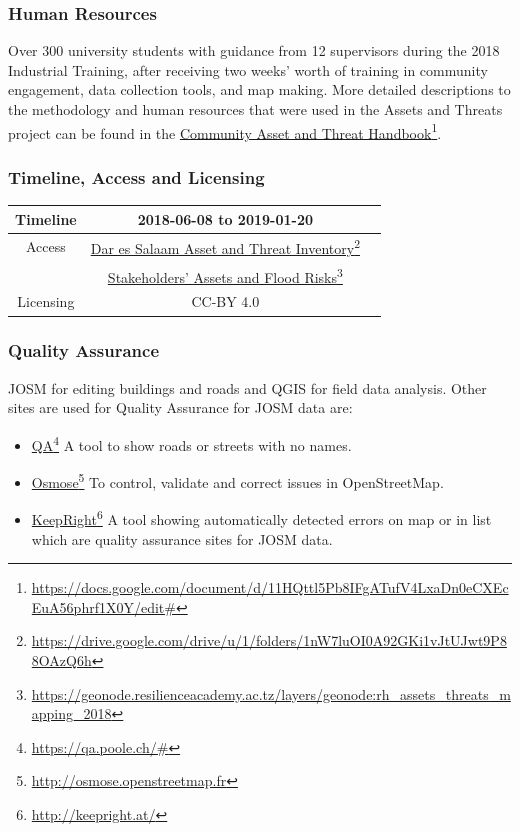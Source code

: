 \documentclass[a4paper,12pt,twoside]{article}
\begin{document}
\subsubsection{Human Resources}
Over 300 university students with guidance from 12 supervisors during the 2018 Industrial Training, after receiving two weeks’ worth of training in community engagement, data collection tools, and map making. More detailed descriptions to the methodology and human resources that were used in the Assets and Threats project can be found in the \href{https://docs.google.com/document/d/11HQttl5Pb8IFgATufV4LxaDn0eCXEcEuA56phrf1X0Y/edit#}{Community Asset and Threat Handbook}\footnote{\url{https://docs.google.com/document/d/11HQttl5Pb8IFgATufV4LxaDn0eCXEcEuA56phrf1X0Y/edit#}}.

\subsubsection{Timeline, Access and Licensing}
\begin{center}
\begin{tabular}{|c|c|c|}  
 \hline
  Timeline  &   2018-06-08 to 2019-01-20 \\
\hline  
 Access  & 
    \href{https://drive.google.com/drive/u/1/folders/1nW7luOI0A92GKi1vJtUJwt9P88OAzQ6h}{Dar es Salaam Asset and Threat Inventory}\footnote{\url{https://drive.google.com/drive/u/1/folders/1nW7luOI0A92GKi1vJtUJwt9P88OAzQ6h}} \\
    {} & \href{https://geonode.resilienceacademy.ac.tz/layers/geonode:rh_assets_threats_mapping_2018}{Stakeholders' Assets and Flood Risks}\footnote{\url{https://geonode.resilienceacademy.ac.tz/layers/geonode:rh_assets_threats_mapping_2018}}\\
   
\hline 
    Licensing & CC-BY 4.0 \\
\hline
\end{tabular}
\end{center}

\subsubsection{Quality Assurance}
JOSM for editing buildings and roads and QGIS for field data analysis. Other sites are used for Quality Assurance for JOSM data are:
\begin{itemize}
    \item \href{https://qa.poole.ch/\#}{QA}\footnote{\url{https://qa.poole.ch/\#}}
    A tool to show roads or streets with no names.

    \item \href{http://osmose.openstreetmap.fr}{Osmose}\footnote{\url{http://osmose.openstreetmap.fr}}
    To  control, validate and correct issues in OpenStreetMap.

    \item \href{http://keepright.at/}{KeepRight}\footnote{\url{http://keepright.at/}}
    A tool showing automatically detected errors on map or in list which are quality assurance sites for JOSM data.

\end{itemize}
\end{document}

